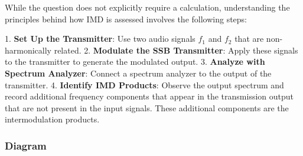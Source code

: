 While the question does not explicitly require a calculation, understanding the principles behind how IMD is assessed involves the following steps:

1. \textbf{Set Up the Transmitter}: Use two audio signals \( f_1 \) and \( f_2 \) that are non-harmonically related.
2. \textbf{Modulate the SSB Transmitter}: Apply these signals to the transmitter to generate the modulated output. 
3. \textbf{Analyze with Spectrum Analyzer}: Connect a spectrum analyzer to the output of the transmitter. 
4. \textbf{Identify IMD Products}: Observe the output spectrum and record additional frequency components that appear in the transmission output that are not present in the input signals. These additional components are the intermodulation products.

\subsubsection{Diagram}

